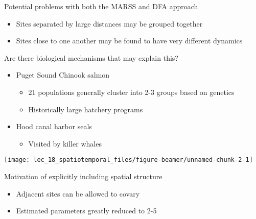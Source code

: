 \documentclass[ignorenonframetext,]{beamer}
\providecommand{\tightlist}{%
  \setlength{\itemsep}{0pt}\setlength{\parskip}{0pt}}
\begin{document}
\begin{frame}{Potential problems with both the MARSS and DFA approach}
\protect\hypertarget{potential-problems-with-both-the-marss-and-dfa-approach}{}

\begin{itemize}
\item
  Sites separated by large distances may be grouped together
\item
  Sites close to one another may be found to have very different
  dynamics
\end{itemize}

\end{frame}

\begin{frame}{Are there biological mechanisms that may explain this?}
\protect\hypertarget{are-there-biological-mechanisms-that-may-explain-this}{}

\begin{itemize}
\tightlist
\item
  Puget Sound Chinook salmon

  \begin{itemize}
  \tightlist
  \item
    21 populations generally cluster into 2-3 groups based on genetics
  \item
    Historically large hatchery programs
  \end{itemize}
\item
  Hood canal harbor seals

  \begin{itemize}
  \tightlist
  \item
    Visited by killer whales
  \end{itemize}
\end{itemize}

\begin{center}\texttt{[image: lec\_18\_spatiotemporal\_files/figure-beamer/unnamed-chunk-2-1]} \end{center}

\end{frame}

\begin{frame}{Motivation of explicitly including spatial structure}
\protect\hypertarget{motivation-of-explicitly-including-spatial-structure}{}

\begin{itemize}
\item
  Adjacent sites can be allowed to covary
\item
  Estimated parameters greatly reduced to 2-5
\end{itemize}

\end{frame}
\end{document}
